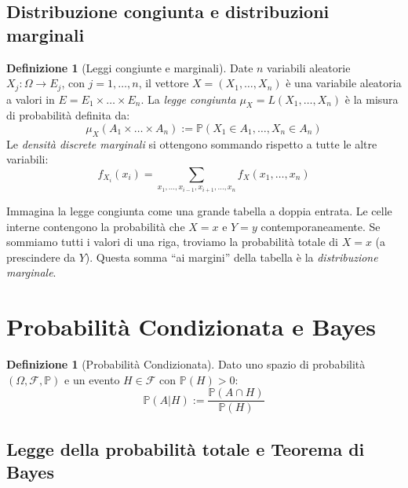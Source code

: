 \documentclass[11pt, a4paper]{report}
\theoremstyle{plain}
\theoremstyle{definition}
\newtheorem{definition}[theorem]{Definizione}
\theoremstyle{remark}
\newcommand{\PP}{\mathbb{P}}
\newcommand{\F}{\mathcal{F}}
\newcommand{\1}{\mathbf{1}}
\begin{document}
\subsection{Distribuzione congiunta e distribuzioni marginali}

\begin{definition}[Leggi congiunte e marginali]
Date $n$ variabili aleatorie $X_j : \Omega \to E_j$, con $j=1,\dots,n$, il vettore $X = (X_1, \dots, X_n)$ è una variabile aleatoria a valori in $E = E_1 \times \dots \times E_n$.
La \emph{legge congiunta} $\mu_X = L(X_1, \dots, X_n)$ è la misura di probabilità definita da:
\[ \mu_X(A_1 \times \dots \times A_n) := \PP(X_1 \in A_1, \dots, X_n \in A_n) \]
Le \emph{densità discrete marginali} si ottengono sommando rispetto a tutte le altre variabili:
\[ f_{X_i}(x_i) = \sum_{x_1, \dots, x_{i-1}, x_{i+1}, \dots, x_n} f_X(x_1, \dots, x_n) \]
\end{definition}

\begin{spiegazione}
    Immagina la legge congiunta come una grande tabella a doppia entrata. Le celle interne contengono la probabilità che $X=x$ e $Y=y$ contemporaneamente. 
    Se sommiamo tutti i valori di una riga, troviamo la probabilità totale di $X=x$ (a prescindere da $Y$). Questa somma ``ai margini'' della tabella è la \emph{distribuzione marginale}.
\end{spiegazione}

\section{Probabilità Condizionata e Bayes}

\begin{definition}[Probabilità Condizionata]
Dato uno spazio di probabilità $(\Omega, \F, \PP)$ e un evento $H \in \F$ con $\PP(H) > 0$:
\[ \PP(A|H) := \frac{\PP(A \cap H)}{\PP(H)} \]
\end{definition}

\subsection{Legge della probabilità totale e Teorema di Bayes}
\end{document}
